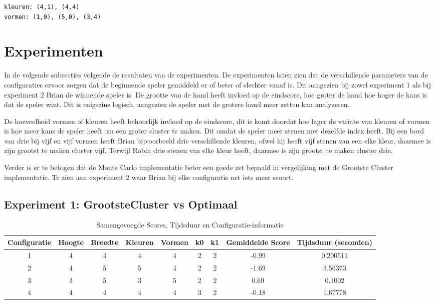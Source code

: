 \documentclass[10pt]{article}
\begin{document}
\begin{verbatim}
kleuren: (4,1), (4,4)
vormen: (1,0), (5,0), (3,4)
\end{verbatim}
 

\section{Experimenten}
In de volgende subsecties volgende de resultaten van de experimenten.
De experimenten laten zien dat de verschillende parameters van de configuraties ervoor zorgen dat de beginnende speler gemiddeld er of beter of slechter vanaf is.
Dit aangezien bij zowel experiment 1 als bij experiment 2 Brian de winnende speler is.
De grootte van de hand heeft invloed op de eindscore, hoe groter de hand hoe hoger de kans is dat de speler wint.
Dit is enigszins logisch, aangezien de speler met de grotere hand meer zetten kan analyzeren.

De hoeveelheid vormen of kleuren heeft behoorlijk invloed op de eindscore, dit is komt doordat hoe lager de variate van kleuren of vormen is hoe meer kans de speler heeft om een groter cluster te maken. 
Dit omdat de speler meer stenen met dezelfde index heeft.
Bij een bord van drie bij vijf en vijf vormen heeft Brian bijvoorbeeld drie verschillende kleuren, ofwel hij heeft vijf stenen van een elke kleur, daarmee is zijn grootst te maken cluster vijf.
Terwijl Robin drie stenen van elke kleur heeft, daarmee is zijn grootst te maken cluster drie.


Verder is er te betogen dat de Monte Carlo implementatie beter een goede zet bepaald in vergelijking met de Grootste Cluster implementatie. 
Te zien aan experiment 2 waar Brian bij elke configuratie net iets meer scoort.

\subsection{Experiment 1: GrootsteCluster vs Optimaal}

\begin{table}[h]
    \centering
    \caption{Samengevoegde Scores, Tijdsduur en Configuratie-informatie}
    \begin{tabular}{@{}ccccccccc@{}}
        \toprule
        Configuratie & Hoogte & Breedte &  Kleuren & Vormen & k0 & k1 & Gemiddelde Score & Tijdsduur (seconden) \\ 
        \midrule
        1 & 4 & 4  & 4& 4 & 2 & 2 & -0.99 & 0.200511 \\
        2 & 4 & 5  & 5& 4 & 2 & 2 & -1.69 & 3.56373 \\
        3 & 3 & 5  & 3& 5 & 2 & 2 & 0.69 & 0.1002 \\
        4 & 4 & 4  & 4& 4 & 3 & 2 & -0.18 & 1.67778 \\ 
        \bottomrule
    \end{tabular}
\end{table}
\FloatBarrier
\end{document}

